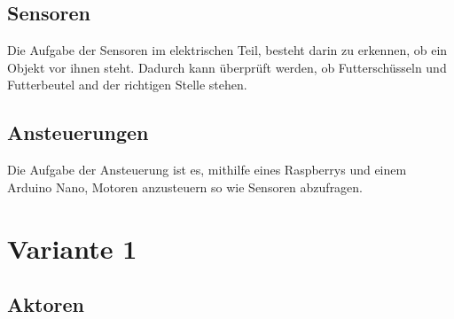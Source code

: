 \subsection{Sensoren}
Die Aufgabe der Sensoren im elektrischen Teil, besteht darin zu erkennen, ob ein Objekt vor ihnen steht. Dadurch kann überprüft werden, ob Futterschüsseln und Futterbeutel and der richtigen Stelle stehen.
\subsection{Ansteuerungen}
Die Aufgabe der Ansteuerung ist es, mithilfe eines Raspberrys und einem Arduino Nano, Motoren anzusteuern so wie Sensoren abzufragen. 
\newpage
\section{Variante 1}
\subsection{Aktoren}
